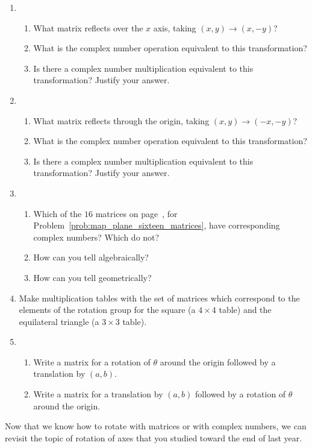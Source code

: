 \documentclass[../gatm.tex]{subfiles}
\begin{document}
\begin{enumerate}
\item\begin{enumerate}
\item What matrix reflects over the $x$ axis, taking $(x,y)\to (x,-y)$?
\item What is the complex number operation equivalent to this transformation?
\item Is there a complex number multiplication equivalent to this transformation? Justify your answer.
\end{enumerate}
\item\begin{enumerate}
\item What matrix reflects through the origin, taking $(x,y)\to (-x,-y)$?
\item What is the complex number operation equivalent to this transformation?
\item Is there a complex number multiplication equivalent to this transformation? Justify your answer.
\end{enumerate}
\item \begin{enumerate}
\item Which of the $16$ matrices on page~\pageref{prob:map_plane_sixteen_matrices}, for Problem~\ref{prob:map_plane_sixteen_matrices}, have corresponding complex numbers? Which do not?
\item How can you tell algebraically?
\item How can you tell geometrically?
\end{enumerate}
\item Make multiplication tables with the set of matrices which correspond to the elements of the rotation group for the square (a $4\times 4$ table) and the equilateral triangle (a $3\times 3$ table).
\item \begin{enumerate}
\item Write a matrix for a rotation of $\theta$ around the origin followed by a translation by $(a,b)$.
\item Write a matrix for a translation by $(a,b)$ followed by a rotation of $\theta$ around the origin.
\end{enumerate}
\end{enumerate}

Now that we know how to rotate with matrices or with complex numbers, we can revisit the topic of rotation of axes that you studied toward the end of last year.
\end{document}
